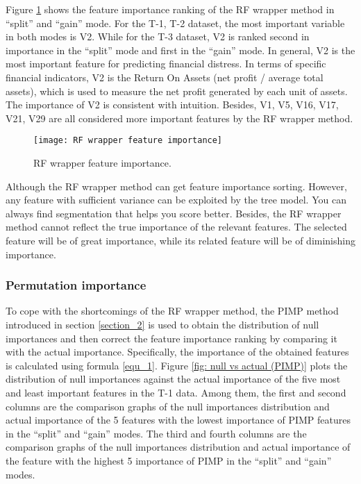 \documentclass[review]{elsarticle}
\begin{document}
Figure \ref{fig: RF Wrapper Feature Importance} shows the feature importance ranking of the RF wrapper method in ``split'' and ``gain'' mode. For the T-1, T-2 dataset, the most important variable in both modes is V2. While for the T-3 dataset, V2 is ranked second in importance in the ``split'' mode and first in the ``gain'' mode. In general, V2 is the most important feature for predicting financial distress. In terms of specific financial indicators, V2 is the Return On Assets (net profit / average total assets), which is used to measure the net profit generated by each unit of assets. The importance of V2 is consistent with intuition. Besides, V1, V5, V16, V17, V21, V29 are all considered more important features by the RF wrapper method.

\begin{figure}[H]
    \centering
    \texttt{[image: RF wrapper feature importance]}
    \caption{RF wrapper feature importance.}
    \label{fig: RF Wrapper Feature Importance}
\end{figure}

Although the RF wrapper method can get feature importance sorting. However, any feature with sufficient variance can be exploited by the tree model. You can always find segmentation that helps you score better. Besides, the RF wrapper method cannot reflect the true importance of the relevant features. The selected feature will be of great importance, while its related feature will be of diminishing importance.

\subsubsection{Permutation importance}
To cope with the shortcomings of the RF wrapper method, the PIMP method introduced in section \ref{section_2} is used to obtain the distribution of null importances and then correct the feature importance ranking by comparing it with the actual importance. Specifically, the importance of the obtained features is calculated using formula \ref{equ_1}. Figure \ref{fig: null vs actual (PIMP)} plots the distribution of null importances against the actual importance of the five most and least important features in the T-1 data. Among them, the first and second columns are the comparison graphs of the null importances distribution and actual importance of the 5 features with the lowest importance of PIMP features in the ``split'' and ``gain'' modes. The third and fourth columns are the comparison graphs of the null importances distribution and actual importance of the feature with the highest 5 importance of PIMP in the ``split'' and ``gain'' modes.
\end{document}
